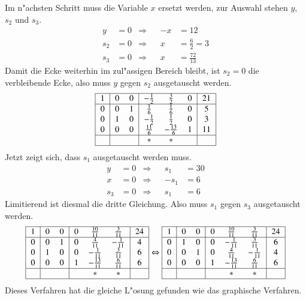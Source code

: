 Im n"achsten Schritt muss die Variable $x$ ersetzt werden, zur 
Auswahl stehen $y$, $s_2$ und $s_3$.
\begin{align*}
  y&=0&\Rightarrow&& -x&= 12
\\
s_2&=0&\Rightarrow&&  x&= \frac{6}{2} = 3
\\
s_3&=0&\Rightarrow&&  x&= \frac{72}{13}
\end{align*}
Damit die Ecke weiterhin im zul"assigen Bereich bleibt, ist $s_2=0$
die verbleibende Ecke, also muss $y$ gegen $s_2$ ausgetauscht werden.
\[
\begin{tabular}{|>{$}c<{$}|>{$}c<{$}>{$}c<{$}|>{$}c<{$}>{$}c<{$}>{$}c<{$}|>{$}c<{$}|}
\hline
1&         0& 0&   -\frac12&    \frac32&      0& 21\\
\hline
0&         0& 1&    \frac16&    \frac16&      0&  5\\
0&         1& 0&   -\frac12&    \frac12&      0&  3\\
0&         0& 0& \frac{11}6&-\frac{13}6&      1& 11\\
\hline
 &  &  & *& *&  &  \\
\hline
\end{tabular}
\]
Jetzt zeigt sich, dass $s_1$ ausgetauscht werden muss. 
\begin{align*}
  y&=0&\Rightarrow&& s_1&= 30
\\
  x&=0&\Rightarrow&& -s_1&= 6
\\
s_3&=0&\Rightarrow&& s_1&= 6
\end{align*}
Limitierend ist diesmal die dritte Gleichung. Also muss $s_1$ gegen
$s_3$ ausgetauscht werden.
\[
\begin{tabular}{|>{$}c<{$}|>{$}c<{$}>{$}c<{$}|>{$}c<{$}>{$}c<{$}>{$}c<{$}|>{$}c<{$}|}
\hline
1&         0& 0&          0& \frac{10}{11}& \frac{3}{11}& 24\\
\hline
0&         0& 1&          0&  \frac{4}{11}&-\frac{1}{11}&  4\\
0&         1& 0&          0& -\frac{1}{11}& \frac{3}{11}&  6\\
0&         0& 0&          1&-\frac{13}{11}& \frac{6}{11}&  6\\
\hline
 &          &  &           &             *&            *&  \\
\hline
\end{tabular}
\Leftrightarrow
\begin{tabular}{|>{$}c<{$}|>{$}c<{$}>{$}c<{$}|>{$}c<{$}>{$}c<{$}>{$}c<{$}|>{$}c<{$}|}
\hline
1&         0& 0&          0& \frac{10}{11}& \frac{3}{11}& 24\\
\hline
0&         1& 0&          0& -\frac{1}{11}& \frac{3}{11}&  6\\
0&         0& 1&          0&  \frac{4}{11}&-\frac{1}{11}&  4\\
0&         0& 0&          1&-\frac{13}{11}& \frac{6}{11}&  6\\
\hline
 &          &  &           &             *&            *&  \\
\hline
\end{tabular}
\]
Dieses Verfahren hat die gleiche L"osung gefunden wie das
graphische Verfahren.

